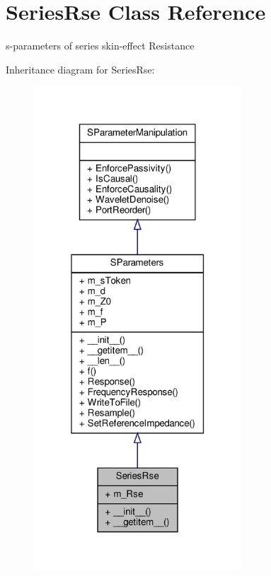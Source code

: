 \hypertarget{classSignalIntegrity_1_1SParameters_1_1Devices_1_1SeriesRse_1_1SeriesRse}{}\section{Series\+Rse Class Reference}
\label{classSignalIntegrity_1_1SParameters_1_1Devices_1_1SeriesRse_1_1SeriesRse}


s-\/parameters of series skin-\/effect Resistance  




Inheritance diagram for Series\+Rse\+:\nopagebreak
\begin{figure}[H]
\begin{center}
\leavevmode
\includegraphics[width=220pt]{classSignalIntegrity_1_1SParameters_1_1Devices_1_1SeriesRse_1_1SeriesRse__inherit__graph}
\end{center}
\end{figure}


